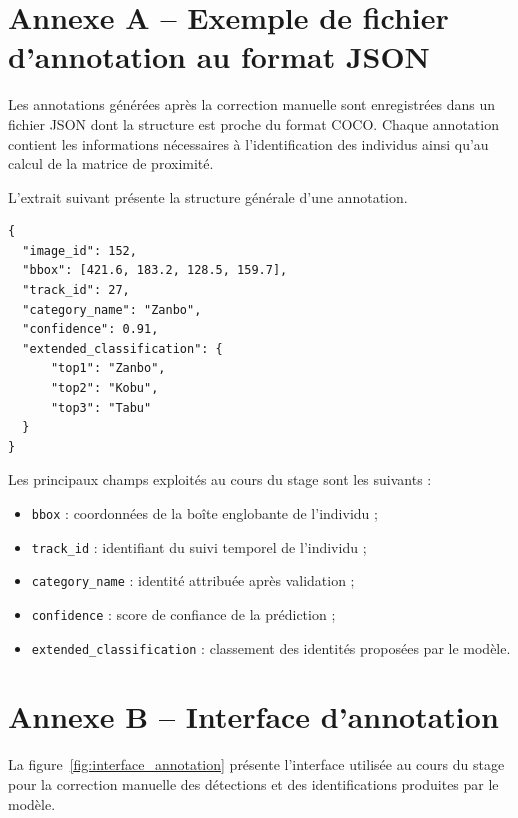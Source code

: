 \documentclass[11pt,a4paper]{report}
\begin{document}
\section*{Annexe A -- Exemple de fichier d'annotation au format JSON}

Les annotations générées après la correction manuelle sont enregistrées
dans un fichier JSON dont la structure est proche du format COCO. Chaque
annotation contient les informations nécessaires à l'identification des
individus ainsi qu'au calcul de la matrice de proximité.

L'extrait suivant présente la structure générale d'une annotation.

\begin{verbatim}
{
  "image_id": 152,
  "bbox": [421.6, 183.2, 128.5, 159.7],
  "track_id": 27,
  "category_name": "Zanbo",
  "confidence": 0.91,
  "extended_classification": {
      "top1": "Zanbo",
      "top2": "Kobu",
      "top3": "Tabu"
  }
}
\end{verbatim}

Les principaux champs exploités au cours du stage sont les suivants :

\begin{itemize}
    \item \texttt{bbox} : coordonnées de la boîte englobante de l'individu ;
    \item \texttt{track\_id} : identifiant du suivi temporel de l'individu ;
    \item \texttt{category\_name} : identité attribuée après validation ;
    \item \texttt{confidence} : score de confiance de la prédiction ;
    \item \texttt{extended\_classification} : classement des identités proposées par le modèle.
\end{itemize}

\section*{Annexe B -- Interface d'annotation}

La figure~\ref{fig:interface_annotation} présente l'interface utilisée au
cours du stage pour la correction manuelle des détections et des
identifications produites par le modèle.
\end{document}
